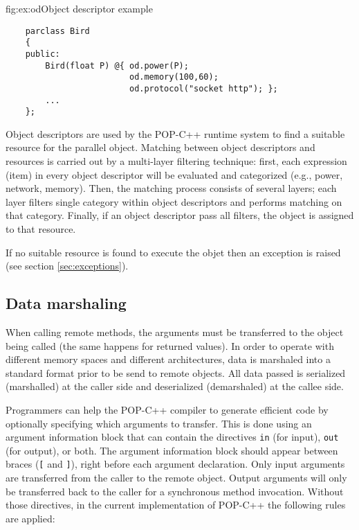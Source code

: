 \begin{figura}{fig:ex:od}{Object descriptor example}%
\vspace{-4mm}%
\begin{verbatim}
    parclass Bird
    {
    public:
        Bird(float P) @{ od.power(P);
                         od.memory(100,60);
                         od.protocol("socket http"); };
        ...
    };
\end{verbatim}
\end{figura}


Object descriptors are used by the POP-C++ runtime system to find a
suitable resource for the parallel object. Matching between object
descriptors and resources is carried out by a multi-layer filtering
technique: first, each expression (item) in every object descriptor will
be evaluated and categorized (e.g., power, network, memory). Then, the
matching process consists of several layers; each layer filters single
category within object descriptors and performs matching on that
category. Finally, if an object descriptor pass all filters, the object
is assigned to that resource.

If no suitable resource is found to execute the objet then an exception
is raised (see section \ref{sec:exceptions}).


\subsection{Data marshaling} \label{sec:marshaling}

When calling remote methods, the arguments must be transferred to the
object being called (the same happens for returned values). In order to
operate with different memory spaces and different architectures, data is marshaled
into a standard format prior to be send to remote objects. All data passed
is serialized (marshalled) at the caller side and deserialized (demarshaled)
at the callee side.

Programmers can help the POP-C++ compiler to generate efficient code by
optionally specifying which arguments to transfer. This is done using an
argument information block that can contain the directives \texttt{in}
(for input), \texttt{out} (for output), or both. The argument
information block should appear between braces (\texttt{[} and
\texttt{]}), right before each argument declaration.
Only input arguments are transferred from the caller to the remote object. 
Output arguments will only be transferred back to the
caller for a synchronous method invocation. Without those
directives, in the current implementation of POP-C++ the following rules
are applied:

